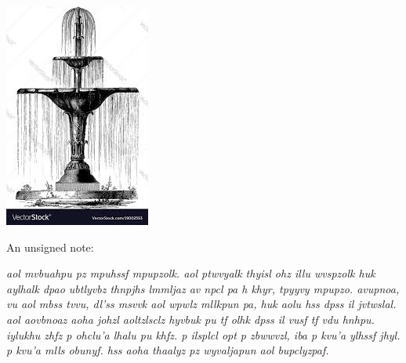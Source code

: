 \documentclass[white]{gl2018}
\begin{document}
\name{\wLindenOne{}}

\begin{center}
\includegraphics[scale=.3]{fountain}
\end{center}

An unsigned note: 

\begin{changemargin}{3cm}{3cm}
\emph{aol mvbuahpu pz mpuhssf mpupzolk. aol ptwvyalk thyisl ohz illu wvspzolk huk aylhalk dpao ubtlyvbz thnpjhs lmmljaz av npcl pa h khyr, tpyyvy mpupzo. avupnoa, vu aol mbss tvvu, dl’ss msvvk aol wpwlz mllkpun pa, huk aolu hss dpss il jvtwslal. aol aovbnoaz aoha johzl aoltzlsclz hyvbuk pu tf olhk dpss il vusf tf vdu hnhpu. iylukhu zhfz p ohclu’a lhalu pu khfz. p ilsplcl opt p zbwwvzl, iba p kvu’a ylhssf jhyl. p kvu’a mlls obunyf. hss aoha thaalyz pz wyvaljapun aol bupclyzpaf.}
\end{changemargin}
\end{document}
